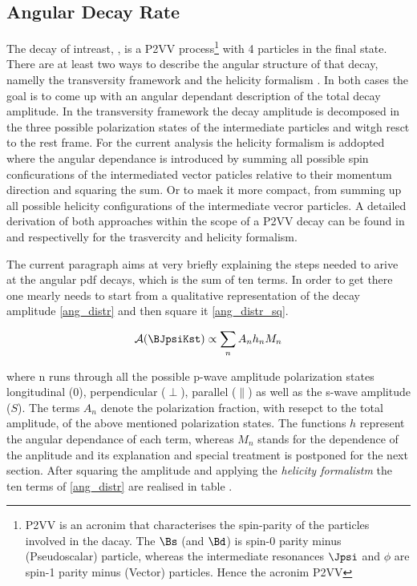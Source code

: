 
\subsection{Angular Decay Rate}
\label{Diferential_Decay_Rate}
The decay of intreast, \BJpsiKst, is a P2VV process\footnote{P2VV is an acronim that characterises the spin-parity of the particles involved in the dacay.
The $\Bs$ (and $\Bd$) is spin-0 parity minus (Pseudoscalar) particle, whereas the intermediate resonances $\Jpsi$ and $\phi$ are spin-1 parity minus (Vector) particles. Hence the
acronim P2VV} with 4 particles in the final state. There are at least two ways to describe the angular structure of that decay, namelly the transversity framework \cite{transvFrameworkI,transvFrameworkII}
and the helicity formalism \cite{helicityFormI,helicityFormII}. In both cases the goal is to come up with an angular dependant description of the total decay amplitude.
In the transversity framework the decay amplitude is decomposed in the three possible polarization states of the intermediate particles \Jpsi and \Kst witgh resct to the \Bs rest frame. For the current analysis the helicity
formalism is addopted where the angular dependance is introduced by summing all possible spin conficurations of the intermediated vector paticles relative to their 
momentum direction and squaring the sum. Or to maek it more compact, from summing up all possible helicity configurations of the intermediate vecror particles. A detailed derivation of both 
approaches within the scope of a P2VV decay can be found in \cite{daanThesis} and \cite{jeroenThesis} respectivelly for the trasvercity and helicity formalism.
 
The current paragraph aims at very briefly explaining the steps needed to arive at the angular pdf \BsJpsiKst decays, which is the sum of ten terms. In order to get there 
one mearly needs to start from a qualitative representation of the \BsJpsiKst decay amplitude \eqref{ang_distr} and then square it \eqref{ang_distr_sq}.  

\begin{equation}
\mathcal{A(\text{\BJpsiKst})} \propto \sum_n A_n h_n M_n
\label{ang_distr}
\end{equation}

\noindent where n runs through all the possible p-wave amplitude polarization states longitudinal ($0$), perpendicular ($\perp$), parallel ($\parallel$) as well as the s-wave amplitude ($S$). 
The terms $A_n$ denote the polarization fraction, with resepct to the total amplitude, of the above mentioned polarization states. The functions $h$ represent the angular dependance of each term,
whereas $M_n$ stands for the \mkpi dependence of the anplitude and its explanation and special treatment is postponed for the next section. After squaring the amplitude and applying the \emph{helicity formalistm}
the ten terms of \eqref{ang_distr} are realised in table \tabref{}.

